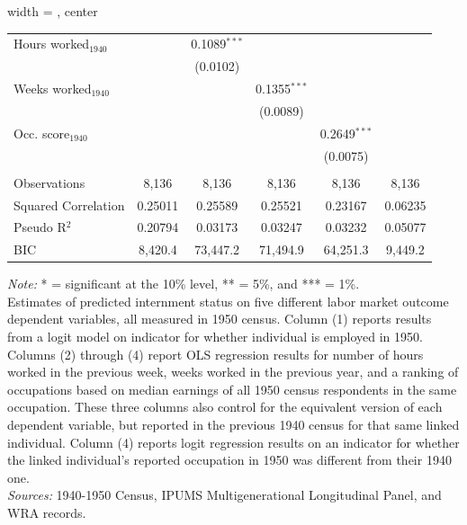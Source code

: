 \begin{table}[htbp]
\begin{adjustbox}{width = \textwidth, center}
\begin{tabular}{lccccc}
         Hours worked$_{1940}$ &                 & 0.1089$^{***}$  &                 &                 &   \\   
                               &                 & (0.0102)        &                 &                 &   \\   
         Weeks worked$_{1940}$ &                 &                 & 0.1355$^{***}$  &                 &   \\   
                               &                 &                 & (0.0089)        &                 &   \\   
         Occ. score$_{1940}$        &                 &                 &                 & 0.2649$^{***}$  &   \\   
                               &                 &                 &                 & (0.0075)        &   \\   
          \\
         Observations          & 8,136           & 8,136           & 8,136           & 8,136           & 8,136\\  
         Squared Correlation   & 0.25011         & 0.25589         & 0.25521         & 0.23167         & 0.06235\\  
         Pseudo R$^2$          & 0.20794         & 0.03173         & 0.03247         & 0.03232         & 0.05077\\  
         BIC                   & 8,420.4         & 73,447.2        & 71,494.9        & 64,251.3        & 9,449.2\\  
         \bottomrule
      \end{tabular}
   \end{adjustbox}
   {\footnotesize
   \emph{Note:}
   * = significant at the 10\% level,
   ** = 5\%, and
   *** = 1\%. \\
   Estimates of predicted internment status on 
   five different labor market outcome dependent variables,
   all measured in 1950 census.
   Column (1) reports results from a logit model on indicator for whether individual is employed in 1950.
   Columns (2) through (4) report OLS regression results 
   for number of hours worked in the previous week,
   weeks worked in the previous year,
   and a ranking of occupations based on median earnings of all 1950 census respondents in the same occupation.
   These three columns also control for the equivalent version of each dependent variable,
   but reported in the previous 1940 census for that same linked individual.
   Column (4) reports logit regression results on an indicator for whether
   the linked individual's reported occupation in 1950 was different from their 1940 one. \\
   \emph{Sources:} 1940-1950 Census, IPUMS Multigenerational Longitudinal Panel,
   and WRA records.
   }
\end{table}